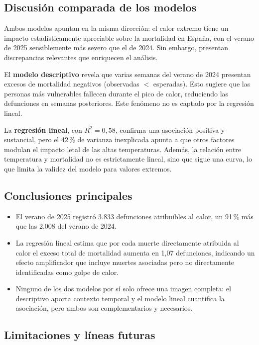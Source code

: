 \documentclass[11pt, a4paper]{article}
\begin{document}
\subsection{Discusión comparada de los modelos}

Ambos modelos apuntan en la misma dirección: el calor extremo tiene un impacto
estadísticamente apreciable sobre la mortalidad en España, con el verano de
2025 sensiblemente más severo que el de 2024. Sin embargo, presentan
discrepancias relevantes que enriquecen el análisis.

El \textbf{modelo descriptivo} revela que varias semanas del verano de 2024
presentan excesos de mortalidad negativos (observadas $<$ esperadas). Esto 
sugiere que las personas más vulnerables fallecen durante el pico de calor,
reduciendo las defunciones en semanas posteriores. Este fenómeno no es captado
por la regresión lineal.

La \textbf{regresión lineal}, con $R^2 = 0{,}58$, confirma una
asociación positiva y sustancial, pero el 42\,\% de varianza inexplicada
apunta a que otros factores modulan el impacto letal de las altas temperaturas. 
Además, la relación entre temperatura y mortalidad no es estrictamente
lineal, sino que sigue una curva, lo que limita la validez
del modelo para valores extremos.

\subsection{Conclusiones principales}

\begin{itemize}
  \item El verano de 2025 registró 3.833 defunciones atribuibles al calor,
        un 91\,\% más que las 2.008 del verano de 2024.
  \item La regresión lineal estima que por cada muerte directamente atribuida
        al calor el exceso total de mortalidad aumenta en 1{,}07 defunciones,
        indicando un efecto amplificador que incluye muertes asociadas pero no
        directamente identificadas como golpe de calor.
  \item Ninguno de los dos modelos por sí solo ofrece una imagen completa:
        el descriptivo aporta contexto temporal y el modelo lineal cuantifica
        la asociación, pero ambos son complementarios y necesarios.
\end{itemize}

\subsection{Limitaciones y líneas futuras}
\end{document}
